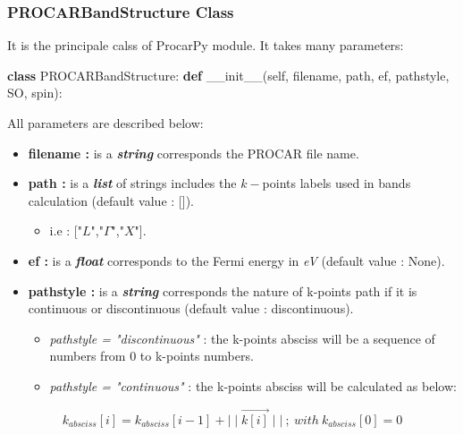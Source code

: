 \documentclass[11pt]{article}
\providecommand{\tightlist}{%
      \setlength{\itemsep}{0pt}\setlength{\parskip}{0pt}}
\newenvironment{Shaded}{}{}
\newcommand{\KeywordTok}[1]{\textcolor[rgb]{0.00,0.44,0.13}{\textbf{{#1}}}}
\newcommand{\FunctionTok}[1]{\textcolor[rgb]{0.02,0.16,0.49}{{#1}}}
\newcommand{\NormalTok}[1]{{#1}}
\newcommand{\VariableTok}[1]{\textcolor[rgb]{0.10,0.09,0.49}{{#1}}}
\begin{document}
\subsubsection{PROCARBandStructure
Class}\label{procarbandstructure-class}

It is the principale calss of ProcarPy module. It takes many parameters:

\begin{Shaded}
\begin{Highlighting}[]
\KeywordTok{class} \NormalTok{PROCARBandStructure:}
    \KeywordTok{def} \FunctionTok{__init__}\NormalTok{(}\VariableTok{self}\NormalTok{, filename, path, ef, pathstyle, SO, spin):}
\end{Highlighting}
\end{Shaded}

All parameters are described below:

\begin{itemize}
\tightlist
\item
  \textbf{filename :} is a \textbf{\emph{string}} corresponds the PROCAR
  file name.
\item
  \textbf{path :} is a \textbf{\emph{list}} of strings includes the
  \(k-\)points labels used in bands calculation (default value :
  {[}{]}).

  \begin{itemize}
  \tightlist
  \item
    i.e : {[}"\(L\)","\(\Gamma\)","\(X\)"{]}.
  \end{itemize}
\item
  \textbf{ef :} is a \textbf{\emph{float}} corresponds to the Fermi
  energy in \emph{eV} (default value : None).
\item
  \textbf{pathstyle :} is a \textbf{\emph{string}} corresponds the
  nature of k-points path if it is continuous or discontinuous (default
  value : discontinuous).

  \begin{itemize}
  \tightlist
  \item
    \emph{pathstyle = "discontinuous"} : the k-points absciss will be a
    sequence of numbers from 0 to k-points numbers.
  \item
    \emph{pathstyle = "continuous"} : the k-points absciss will be
    calculated as below:
  \end{itemize}
\end{itemize}

\begin{equation*}
k_{absciss}[i] = k_{absciss} [i-1] + \mid\mid \vec{k[i]} \mid\mid ~; ~ with ~ k_{absciss}[0] = 0
\end{equation*}
\end{document}

